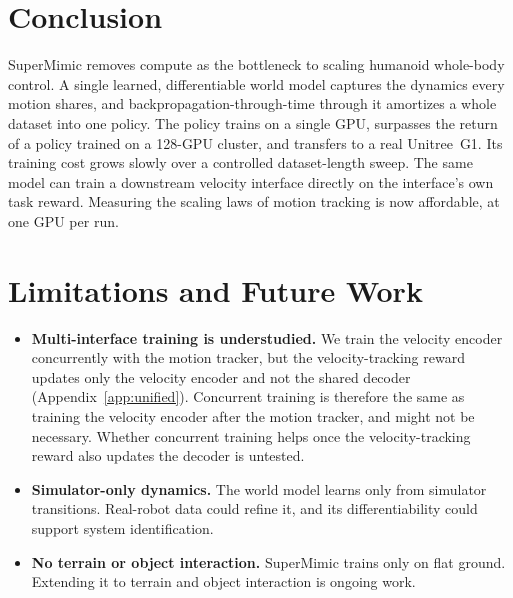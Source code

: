 \section{Conclusion}
SuperMimic removes compute as the bottleneck to scaling humanoid whole-body control. A single learned, differentiable world model captures the dynamics every motion shares, and backpropagation-through-time through it amortizes a whole dataset into one policy. The policy trains on a single GPU, surpasses the return of a policy trained on a 128-GPU cluster, and transfers to a real Unitree~G1. Its training cost grows slowly over a controlled dataset-length sweep. The same model can train a downstream velocity interface directly on the interface's own task reward. Measuring the scaling laws of motion tracking is now affordable, at one GPU per run.

\section{Limitations and Future Work}
\begin{itemize}[leftmargin=*,noitemsep,topsep=2pt]
  \item \textbf{Multi-interface training is understudied.} We train the velocity encoder concurrently with the motion tracker, but the velocity-tracking reward updates only the velocity encoder and not the shared decoder (Appendix~\ref{app:unified}). Concurrent training is therefore the same as training the velocity encoder after the motion tracker, and might not be necessary. Whether concurrent training helps once the velocity-tracking reward also updates the decoder is untested.
  \item \textbf{Simulator-only dynamics.} The world model learns only from simulator transitions. Real-robot data could refine it, and its differentiability could support system identification.
  \item \textbf{No terrain or object interaction.} SuperMimic trains only on flat ground. Extending it to terrain and object interaction is ongoing work.
\end{itemize}
